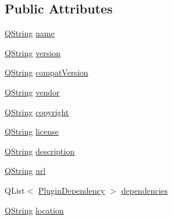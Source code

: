 \subsection*{\-Public \-Attributes}
\begin{DoxyCompactItemize}
\item 
\hyperlink{group___u_a_v_objects_plugin_gab9d252f49c333c94a72f97ce3105a32d}{\-Q\-String} \hyperlink{class_extension_system_1_1_internal_1_1_plugin_spec_private_ab3a82ed362b9755352316778bda2c635}{name}
\item 
\hyperlink{group___u_a_v_objects_plugin_gab9d252f49c333c94a72f97ce3105a32d}{\-Q\-String} \hyperlink{class_extension_system_1_1_internal_1_1_plugin_spec_private_a00cf7a310301d427a56b1b23576289bc}{version}
\item 
\hyperlink{group___u_a_v_objects_plugin_gab9d252f49c333c94a72f97ce3105a32d}{\-Q\-String} \hyperlink{class_extension_system_1_1_internal_1_1_plugin_spec_private_a5bca4f5cd92049fabd441bf9ae2a9734}{compat\-Version}
\item 
\hyperlink{group___u_a_v_objects_plugin_gab9d252f49c333c94a72f97ce3105a32d}{\-Q\-String} \hyperlink{class_extension_system_1_1_internal_1_1_plugin_spec_private_a3628c7ebcd80e71dd74fc0df729aac7a}{vendor}
\item 
\hyperlink{group___u_a_v_objects_plugin_gab9d252f49c333c94a72f97ce3105a32d}{\-Q\-String} \hyperlink{class_extension_system_1_1_internal_1_1_plugin_spec_private_a20718c1d11fe66633f33bfccc7dbfdf6}{copyright}
\item 
\hyperlink{group___u_a_v_objects_plugin_gab9d252f49c333c94a72f97ce3105a32d}{\-Q\-String} \hyperlink{class_extension_system_1_1_internal_1_1_plugin_spec_private_a8060ccf842513091c9821ad6118a22c0}{license}
\item 
\hyperlink{group___u_a_v_objects_plugin_gab9d252f49c333c94a72f97ce3105a32d}{\-Q\-String} \hyperlink{class_extension_system_1_1_internal_1_1_plugin_spec_private_a477c1550169cba561d0cede9d8dc5c2b}{description}
\item 
\hyperlink{group___u_a_v_objects_plugin_gab9d252f49c333c94a72f97ce3105a32d}{\-Q\-String} \hyperlink{class_extension_system_1_1_internal_1_1_plugin_spec_private_a6872e7bd6f42c91c16e3fcd03554f004}{url}
\item 
\-Q\-List$<$ \hyperlink{struct_extension_system_1_1_plugin_dependency}{\-Plugin\-Dependency} $>$ \hyperlink{class_extension_system_1_1_internal_1_1_plugin_spec_private_a1f765a1f76bd2ba2f296f84289e9b44f}{dependencies}
\item 
\hyperlink{group___u_a_v_objects_plugin_gab9d252f49c333c94a72f97ce3105a32d}{\-Q\-String} \hyperlink{class_extension_system_1_1_internal_1_1_plugin_spec_private_a69f6532837e17c9858580b506b5c3448}{location}

\end{DoxyCompactItemize}
